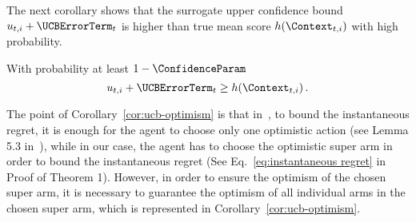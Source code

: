 \documentclass{article}
\theoremstyle{plain}
\begin{document}
%
The next corollary shows that the surrogate upper confidence bound $u_{t,i} + \UCBErrorTerm_t$ is higher than true mean score $h(\Context_{t,i})$ with high probability.
%
\begin{corollary}\label{cor:ucb-optimism}
With probability at least $1-\ConfidenceParam$ 
    \begin{equation*}
        u_{t,i} + \UCBErrorTerm_{t}  \ge h(\Context_{t,i}) \,.
    \end{equation*}
\end{corollary}
%
The point of Corollary~\ref{cor:ucb-optimism} is that in~\citet{zhou2020neural}, to bound the instantaneous regret, it is enough for the agent to choose only one optimistic action (see Lemma 5.3 in~\citet{zhou2020neural}), while in our case, the agent has to choose the optimistic super arm in order to bound the instantaneous regret (See Eq.~\eqref{eq:instantaneous regret} in Proof of Theorem 1). However, in order to ensure the optimism of the chosen super arm, it is necessary to guarantee the optimism of all individual arms in the chosen super arm, which is represented in Corollary~\ref{cor:ucb-optimism}.
\end{document}
